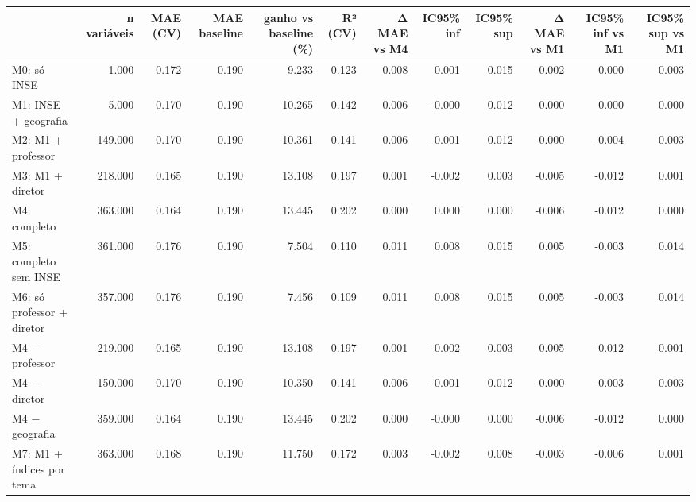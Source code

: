 \begin{tabular}{lrrrrrrrrrrr}
\toprule
 & n variáveis & MAE (CV) & MAE baseline & ganho vs baseline (\%) & R² (CV) & Δ MAE vs M4 & IC95\% inf & IC95\% sup & Δ MAE vs M1 & IC95\% inf vs M1 & IC95\% sup vs M1 \\
\midrule
M0: só INSE & 1.000 & 0.172 & 0.190 & 9.233 & 0.123 & 0.008 & 0.001 & 0.015 & 0.002 & 0.000 & 0.003 \\
M1: INSE + geografia & 5.000 & 0.170 & 0.190 & 10.265 & 0.142 & 0.006 & -0.000 & 0.012 & 0.000 & 0.000 & 0.000 \\
M2: M1 + professor & 149.000 & 0.170 & 0.190 & 10.361 & 0.141 & 0.006 & -0.001 & 0.012 & -0.000 & -0.004 & 0.003 \\
M3: M1 + diretor & 218.000 & 0.165 & 0.190 & 13.108 & 0.197 & 0.001 & -0.002 & 0.003 & -0.005 & -0.012 & 0.001 \\
M4: completo & 363.000 & 0.164 & 0.190 & 13.445 & 0.202 & 0.000 & 0.000 & 0.000 & -0.006 & -0.012 & 0.000 \\
M5: completo sem INSE & 361.000 & 0.176 & 0.190 & 7.504 & 0.110 & 0.011 & 0.008 & 0.015 & 0.005 & -0.003 & 0.014 \\
M6: só professor + diretor & 357.000 & 0.176 & 0.190 & 7.456 & 0.109 & 0.011 & 0.008 & 0.015 & 0.005 & -0.003 & 0.014 \\
M4 − professor & 219.000 & 0.165 & 0.190 & 13.108 & 0.197 & 0.001 & -0.002 & 0.003 & -0.005 & -0.012 & 0.001 \\
M4 − diretor & 150.000 & 0.170 & 0.190 & 10.350 & 0.141 & 0.006 & -0.001 & 0.012 & -0.000 & -0.003 & 0.003 \\
M4 − geografia & 359.000 & 0.164 & 0.190 & 13.445 & 0.202 & 0.000 & -0.000 & 0.000 & -0.006 & -0.012 & 0.000 \\
M7: M1 + índices por tema & 363.000 & 0.168 & 0.190 & 11.750 & 0.172 & 0.003 & -0.002 & 0.008 & -0.003 & -0.006 & 0.001 \\
\bottomrule
\end{tabular}

